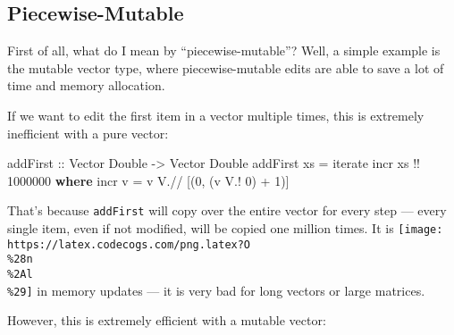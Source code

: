 \documentclass[]{article}
\newenvironment{Shaded}{}{}
\newcommand{\DataTypeTok}[1]{\textcolor[rgb]{0.56,0.13,0.00}{#1}}
\newcommand{\DecValTok}[1]{\textcolor[rgb]{0.25,0.63,0.44}{#1}}
\newcommand{\FunctionTok}[1]{\textcolor[rgb]{0.02,0.16,0.49}{#1}}
\newcommand{\KeywordTok}[1]{\textcolor[rgb]{0.00,0.44,0.13}{\textbf{#1}}}
\newcommand{\NormalTok}[1]{#1}
\newcommand{\OperatorTok}[1]{\textcolor[rgb]{0.40,0.40,0.40}{#1}}
\newcommand{\OtherTok}[1]{\textcolor[rgb]{0.00,0.44,0.13}{#1}}
\begin{document}
\hypertarget{piecewise-mutable}{%
\subsection{Piecewise-Mutable}\label{piecewise-mutable}}

First of all, what do I mean by ``piecewise-mutable''? Well, a simple example is
the mutable vector type, where piecewise-mutable edits are able to save a lot of
time and memory allocation.

If we want to edit the first item in a vector multiple times, this is extremely
inefficient with a pure vector:

\begin{Shaded}
\begin{Highlighting}[]
\OtherTok{addFirst ::} \DataTypeTok{Vector} \DataTypeTok{Double} \OtherTok{{-}>} \DataTypeTok{Vector} \DataTypeTok{Double}
\NormalTok{addFirst xs }\OtherTok{=} \FunctionTok{iterate}\NormalTok{ incr xs }\OperatorTok{!!} \DecValTok{1000000}
  \KeywordTok{where}
\NormalTok{    incr v }\OtherTok{=}\NormalTok{ v }\OperatorTok{V.//}\NormalTok{ [(}\DecValTok{0}\NormalTok{, (v }\OperatorTok{V.!} \DecValTok{0}\NormalTok{) }\OperatorTok{+} \DecValTok{1}\NormalTok{)]}
\end{Highlighting}
\end{Shaded}

That's because \texttt{addFirst} will copy over the entire vector for every step
--- every single item, even if not modified, will be copied one million times.
It is \texttt{[image: https://latex.codecogs.com/png.latex?O\\\%28n\\\%2Al\\\%29]} in
memory updates --- it is very bad for long vectors or large matrices.

However, this is extremely efficient with a mutable vector:

\begin{Shaded}
\end{Shaded}
\end{document}
